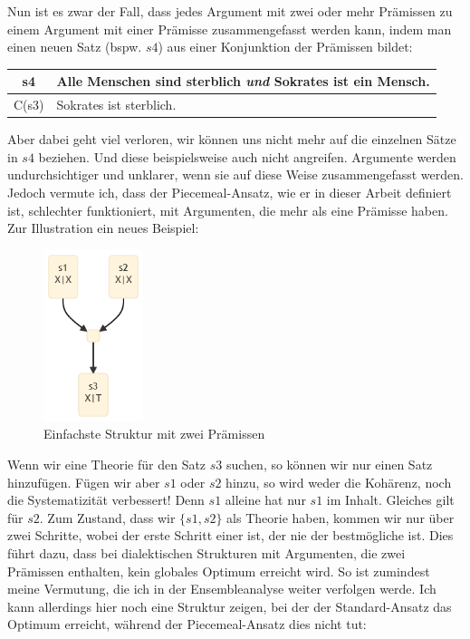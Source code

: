 \documentclass{article}
\begin{document}
Nun ist es zwar der Fall, dass jedes Argument mit zwei oder mehr Prämissen zu einem Argument mit einer Prämisse zusammengefasst werden kann, indem man einen neuen Satz (bspw. $s4$) aus einer Konjunktion der Prämissen bildet:

\begin{center}
\begin{tabular}{c p{9cm}}
s4 & Alle Menschen sind sterblich \textit{und} Sokrates ist ein Mensch.\\\hline
C(s3) & Sokrates ist sterblich. 
\end{tabular}
\end{center}

Aber dabei geht viel verloren, wir können uns nicht mehr auf die einzelnen Sätze in $s4$ beziehen. Und diese beispielsweise auch nicht angreifen. Argumente werden undurchsichtiger und unklarer, wenn sie auf diese Weise zusammengefasst werden.
Jedoch vermute ich, dass der Piecemeal-Ansatz, wie er in dieser Arbeit definiert ist, schlechter funktioniert, mit Argumenten, die mehr als eine Prämisse haben. Zur Illustration ein neues Beispiel:

\begin{figure}[ht]
  \centering
  \includegraphics[width=\textwidth,height=5cm,keepaspectratio]{images/2prem.png}
  \caption{Einfachste Struktur mit zwei Prämissen\label{fig:2prem}}
\end{figure}

Wenn wir eine Theorie für den Satz $s3$ suchen, so können wir nur einen Satz hinzufügen. Fügen wir aber $s1$ oder $s2$ hinzu, so wird weder die Kohärenz, noch die Systematizität verbessert! Denn $s1$ alleine hat nur $s1$ im Inhalt. Gleiches gilt für $s2$. Zum Zustand, dass wir $\{s1,s2\}$ als Theorie haben, kommen wir nur über zwei Schritte, wobei der erste Schritt einer ist, der nie der bestmögliche ist. Dies führt dazu, dass bei dialektischen Strukturen mit Argumenten, die zwei Prämissen enthalten, kein globales Optimum erreicht wird. So ist zumindest meine Vermutung, die ich in der Ensembleanalyse weiter verfolgen werde. Ich kann allerdings hier noch eine Struktur zeigen, bei der der Standard-Ansatz das Optimum erreicht, während der Piecemeal-Ansatz dies nicht tut:
\end{document}
